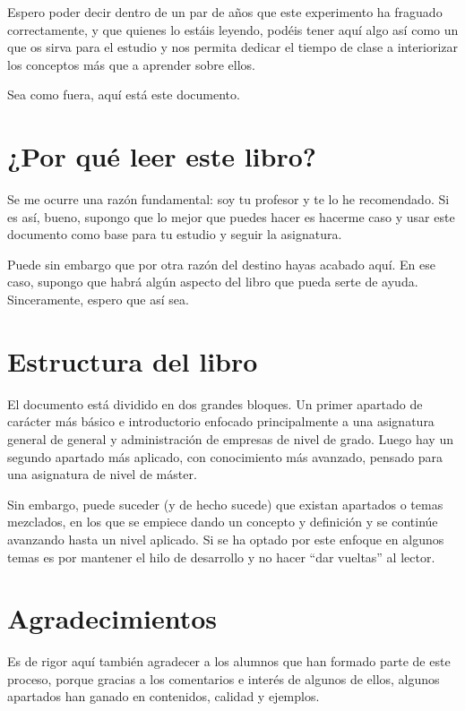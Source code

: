 \documentclass[
]{krantz}
\begin{document}
Espero poder decir dentro de un par de años que este experimento ha fraguado correctamente, y que quienes lo estáis leyendo, podéis tener aquí algo así como un que os sirva para el estudio y nos permita dedicar el tiempo de clase a interiorizar los conceptos más que a aprender sobre ellos.

Sea como fuera, aquí está este documento.

\hypertarget{por-quuxe9-leer-este-libro}{%
\section*{¿Por qué leer este libro?}\label{por-quuxe9-leer-este-libro}}


Se me ocurre una razón fundamental: soy tu profesor y te lo he recomendado. Si es así, bueno, supongo que lo mejor que puedes hacer es hacerme caso y usar este documento como base para tu estudio y seguir la asignatura.

Puede sin embargo que por otra razón del destino hayas acabado aquí. En ese caso, supongo que habrá algún aspecto del libro que pueda serte de ayuda. Sinceramente, espero que así sea.

\hypertarget{estructura-del-libro}{%
\section*{Estructura del libro}\label{estructura-del-libro}}


El documento está dividido en dos grandes bloques. Un primer apartado de carácter más básico e introductorio enfocado principalmente a una asignatura general de general y administración de empresas de nivel de grado. Luego hay un segundo apartado más aplicado, con conocimiento más avanzado, pensado para una asignatura de nivel de máster.

Sin embargo, puede suceder (y de hecho sucede) que existan apartados o temas mezclados, en los que se empiece dando un concepto y definición y se continúe avanzando hasta un nivel aplicado. Si se ha optado por este enfoque en algunos temas es por mantener el hilo de desarrollo y no hacer ``dar vueltas'' al lector.

\hypertarget{agradecimientos}{%
\section*{Agradecimientos}\label{agradecimientos}}


Es de rigor aquí también agradecer a los alumnos que han formado parte de este proceso, porque gracias a los comentarios e interés de algunos de ellos, algunos apartados han ganado en contenidos, calidad y ejemplos.
\end{document}
